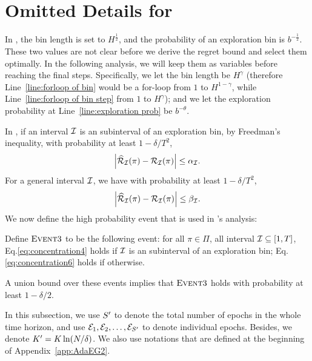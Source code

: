 \section{Omitted Details for \AdaBIN}\label{app:AdaBIN}
In \AdaBIN, the bin length is set to $H^{\frac{1}{2}}$, and the probability of an exploration bin is $b^{-\frac{1}{2}}$. These two values are not clear before we derive the regret bound and select them optimally. In the following analysis, we will keep them as variables before reaching the final steps. Specifically, we let the bin length be $H^{\gamma}$ (therefore Line~\ref{line:forloop of bin} would be a for-loop from $1$ to $H^{1-\gamma}$, while Line~\ref{line:forloop of bin step} from $1$ to $H^\gamma$); and we let the exploration probability at Line~\ref{line:exploration prob} be $b^{-\theta}$. %

In \AdaBIN, if an interval ${\mathcal{I}}$ is an subinterval of an exploration bin, by Freedman's inequality, with probability at least $1-\delta/T^2$, 
\begin{align}
\left| \widehat{\cal{R}}_{{\mathcal{I}}}(\pi) - {\mathcal{R}}_{{\mathcal{I}}}(\pi) \right| \leq \alpha_{{\mathcal{I}}}. \label{eq:concentration4}
\end{align}
For a general interval ${\mathcal{I}}$, we have with probability at least $1-\delta/T^2$, 
\begin{align}
\left| \widehat{\cal{R}}_{{\mathcal{I}}}(\pi) - {\mathcal{R}}_{{\mathcal{I}}}(\pi) \right| \leq \beta_{{\mathcal{I}}}. \label{eq:concentration6}
\end{align}
We now define the high probability event that is used in \AdaBIN's analysis: 
\begin{definition}[$\evt 3$]
Define $\evt 3$ to be the following event: for all $\pi\in\Pi$, all interval ${\mathcal{I}}\subseteq [1,T]$, Eq.\eqref{eq:concentration4} holds if ${\mathcal{I}}$ is an subinterval of an exploration bin; Eq.\eqref {eq:concentration6} holds if otherwise. 
\end{definition}
A union bound over these events implies that $\evt 3$ holds with probability at least $1-\delta/2$. 

In this subsection, we use $S^\prime$ to denote the total number of epochs in the whole time horizon, and use ${\mathcal{E}}_1, {\mathcal{E}}_2, \ldots, {\mathcal{E}}_{S^\prime}$ to denote individual epochs. Besides, we denote $K^\prime=K\ln(N/\delta)$. We also use notations that are defined at the beginning of Appendix~\ref{app:AdaEG2}. 

